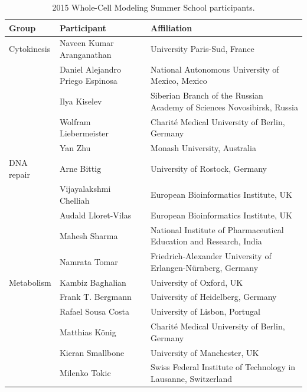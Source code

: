 \documentclass[journal,transmag]{IEEEtran}
\begin{document}
\begin{table}[ht!]
\caption{2015 Whole-Cell Modeling Summer School participants.}
\begin{tabularx}{\textwidth}{l||l||X}\hline
\bfseries Group           & \bfseries Participant            & \bfseries Affiliation\\\hline\hline
Cytokinesis               & Naveen Kumar Aranganathan        & University Paris-Sud, France\\
                          & Daniel Alejandro Priego Espinosa & National Autonomous University of Mexico, Mexico\\
                          & Ilya Kiselev                     & Siberian Branch of the Russian Academy of Sciences Novosibirsk, Russia\\
                          & Wolfram Liebermeister            & Charit\'e Medical University of Berlin, Germany\\
                          & Yan Zhu                          & Monash University, Australia\\\hline
DNA repair                & Arne Bittig                      & University of Rostock, Germany\\
                          & Vijayalakshmi Chelliah           & European Bioinformatics Institute, UK\\
                          & Audald Lloret-Vilas              & European Bioinformatics Institute, UK\\
                          & Mahesh Sharma                    & National Institute of Pharmaceutical Education and Research, India\\
                          & Namrata Tomar                    & Friedrich-Alexander University of Erlangen-N\"urnberg, Germany\\\hline
Metabolism                & Kambiz Baghalian                 & University of Oxford, UK\\
                          & Frank T. Bergmann                & University of Heidelberg, Germany\\
                          & Rafael Sousa Costa               & University of Lisbon, Portugal\\
                          & Matthias K\"onig                 & Charit\'e Medical University of Berlin, Germany\\
                          & Kieran Smallbone                 & University of Manchester, UK\\
                          & Milenko Tokic                    & Swiss Federal Institute of Technology in Lausanne, Switzerland\\\hline

\end{tabularx}
\end{table}
\end{document}
